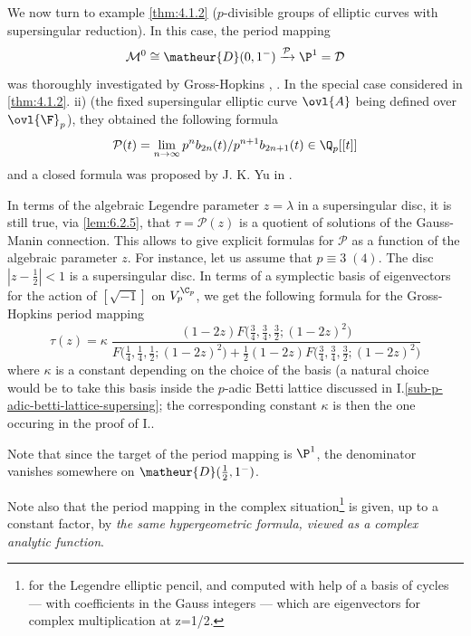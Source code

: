 \begin{para}\label{para:6.3.3}
 We now turn to example \ref{thm:4.1.2} ($p$-divisible groups of
 elliptic curves with supersingular reduction).  In this case, the period
 mapping 
 \begin{equation*}
  \mathcal{M}^0\cong \matheur{D}(0,1^-) \xrightarrow{\mathcal{P}}
  \P^1=\mathcal{D} 
 \end{equation*}
 was thoroughly investigated by Gross-Hopkins
 \cite{gross94:_equiv_lubin_tate}, \cite{trapmlsasht}. 
 In the special case considered in \ref{thm:4.1.2}. ii)
 (the fixed supersingular elliptic curve $\ovl{A}$ being defined over
 $\ovl{\F}_p$), they obtained the following formula
 \begin{equation*}
  \mathcal{P}(t)= \lim_{n\rightarrow \infty}
  p^{n}b_{2n}(t)/p^{n+1}b_{2n+1}(t) \in \Q_p[[t]]
 \end{equation*}
 and a closed formula was proposed by J. K. Yu in \cite[11]{Yu95}.

 \noindent In terms of the algebraic Legendre parameter
 $z=\lambda$ in a supersingular disc, it is still true, via
 \ref{lem:6.2.5}, that 
 $\tau=\mathcal{P}(z)$ is a quotient of solutions of the Gauss-Manin
 connection. This allows to give explicit formulas for $\mathcal{P}$ as a
 function of the algebraic parameter $z$. For instance, let us assume
 that $p\equiv 3\;(4)$. The disc $| z-\frac{1}{2}| <1$ is a
 supersingular disc. In terms of a symplectic basis of eigenvectors for
 the action of $[\sqrt{-1}]$ on $V_p^{\C_p}$, we get the following
 formula for the Gross-Hopkins period mapping
 \begin{equation*}
  \tau(z)=\kappa\;\frac{(1-2z)
   F\bigl(\frac{3}{4},\frac{3}{4},\frac{3}{2};(1-2z)^2\bigr)}
   {F\bigl(\frac{1}{4},\frac{1}{4},\frac{1}{2};(1-2z)^2\bigr)
   +\frac{1}{2}(1-2z)F\bigl(\frac{3}{4},\frac{3}{4},\frac{3}{2};(1-2z)^2\bigr)}
 \end{equation*}
 where $\kappa$ is a constant depending on the choice of the basis (a
 natural choice would be to take this basis inside the $p$-adic Betti
 lattice discussed in I.\ref{sub-p-adic-betti-lattice-supersing}; the
 corresponding constant $\kappa$ is then the one occuring in the proof
 of I..


 Note that since the target of the period mapping is $\P^1$, the
 denominator vanishes somewhere on $\matheur{D}(\frac{1}{2},1^-)$. 
 \par\noindent Note also that the period mapping in the complex
 situation\footnote{for the Legendre elliptic
 pencil, and computed with help of a basis of cycles --- with coefficients
 in the Gauss integers --- which are eigenvectors for complex
 multiplication at z=1/2.} is given, up to a constant factor, by
 {\it the same hypergeometric formula, viewed as a complex analytic function}. 
\end{para}

